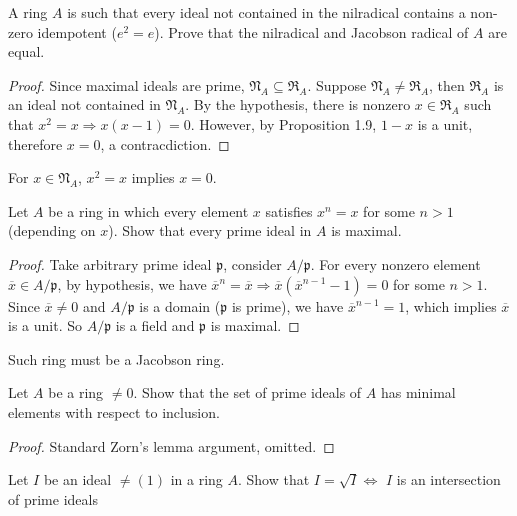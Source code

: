 \documentclass{solution}
\begin{document}
\begin{problem}
    A ring $A$ is such that every ideal not contained in the nilradical contains a non-zero idempotent ($e^2 = e$). Prove that the nilradical and Jacobson radical of $A$ are equal.
\end{problem}

\begin{proof}
    Since maximal ideals are prime, $\mathfrak{N}_A \subseteq \mathfrak{R}_A$. Suppose $\mathfrak{N}_A \ne \mathfrak{R}_A$, then $\mathfrak{R}_A$ is an ideal not contained in $\mathfrak{N}_A$. By the hypothesis, there is nonzero $x \in \mathfrak{R}_A$ such that $x^2 = x \Rightarrow x(x - 1) = 0$. However, by Proposition 1.9, $1 - x$ is a unit, therefore $x = 0$, a contracdiction.
\end{proof}

\begin{remark}
    For $x \in \mathfrak{N}_A$, $x^2 = x$ implies $x = 0$.
\end{remark}

\begin{problem}
    Let $A$ be a ring in which every element $x$ satisfies $x^n = x$ for some $n \gt 1$ (depending on $x$). Show that every prime ideal in $A$ is maximal.
\end{problem}

\begin{proof}
    Take arbitrary prime ideal $\mathfrak{p}$, consider $A / \mathfrak{p}$. For every nonzero element $\overline{x} \in A / \mathfrak{p}$, by hypothesis, we have $\overline{x}^n = \overline{x} \Rightarrow \overline{x}(\overline{x}^{n - 1} - 1) = 0$ for some $n \gt 1$. Since $\overline{x} \ne 0$ and $A / \mathfrak{p}$ is a domain ($\mathfrak{p}$ is prime), we have $\overline{x}^{n - 1} = 1$, which implies $\overline{x}$ is a unit. So $A / \mathfrak{p}$ is a field and $\mathfrak{p}$ is maximal.
\end{proof}

Such ring must be a Jacobson ring.

\begin{problem}
    Let $A$ be a ring $\ne 0$. Show that the set of prime ideals of $A$ has minimal elements with respect to inclusion.
\end{problem}

\begin{proof}
    Standard Zorn's lemma argument, omitted.
\end{proof}

\begin{problem}
    Let $I$ be an ideal $\ne (1)$ in a ring $A$. Show that $I = \sqrt{I} \Leftrightarrow$ $I$ is an intersection of prime ideals
\end{problem}
\end{document}
